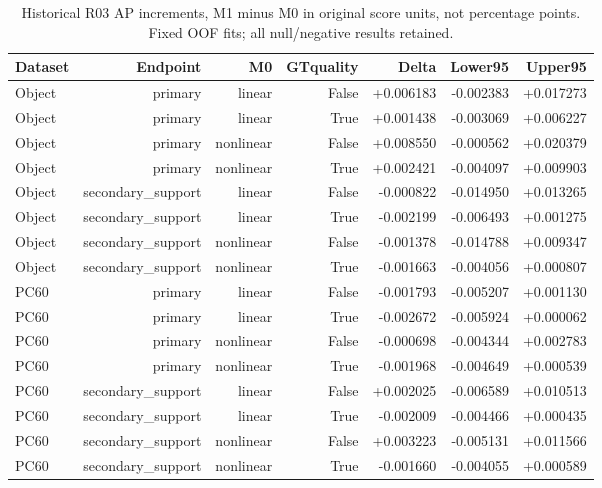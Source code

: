 \begin{table}[htbp]
\centering\scriptsize
\caption{Historical R03 AP increments, M1 minus M0 in original score units, not percentage points. Fixed OOF fits; all null/negative results retained.}
\label{tab:r03-average_precision}
\setlength{\tabcolsep}{4pt}
\begin{tabular}{lrrrrrr}
\toprule
Dataset & Endpoint & M0 & GTquality & Delta & Lower95 & Upper95 \\
\midrule
Object & primary & linear & False & +0.006183 & -0.002383 & +0.017273 \\
Object & primary & linear & True & +0.001438 & -0.003069 & +0.006227 \\
Object & primary & nonlinear & False & +0.008550 & -0.000562 & +0.020379 \\
Object & primary & nonlinear & True & +0.002421 & -0.004097 & +0.009903 \\
Object & secondary\_support & linear & False & -0.000822 & -0.014950 & +0.013265 \\
Object & secondary\_support & linear & True & -0.002199 & -0.006493 & +0.001275 \\
Object & secondary\_support & nonlinear & False & -0.001378 & -0.014788 & +0.009347 \\
Object & secondary\_support & nonlinear & True & -0.001663 & -0.004056 & +0.000807 \\
PC60 & primary & linear & False & -0.001793 & -0.005207 & +0.001130 \\
PC60 & primary & linear & True & -0.002672 & -0.005924 & +0.000062 \\
PC60 & primary & nonlinear & False & -0.000698 & -0.004344 & +0.002783 \\
PC60 & primary & nonlinear & True & -0.001968 & -0.004649 & +0.000539 \\
PC60 & secondary\_support & linear & False & +0.002025 & -0.006589 & +0.010513 \\
PC60 & secondary\_support & linear & True & -0.002009 & -0.004466 & +0.000435 \\
PC60 & secondary\_support & nonlinear & False & +0.003223 & -0.005131 & +0.011566 \\
PC60 & secondary\_support & nonlinear & True & -0.001660 & -0.004055 & +0.000589 \\
\bottomrule
\end{tabular}
\end{table}
